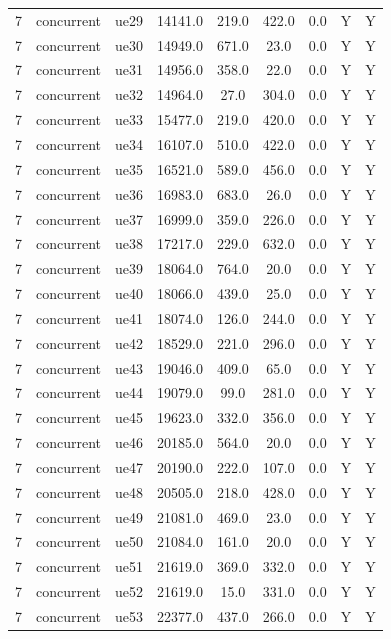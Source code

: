 \begin{table}[ht]
\begin{tabular}{|c|c|c|c|c|c|c|c|c|}
7 & concurrent & ue29 & 14141.0 & 219.0 & 422.0 & 0.0 & Y & Y \\
7 & concurrent & ue30 & 14949.0 & 671.0 & 23.0 & 0.0 & Y & Y \\
7 & concurrent & ue31 & 14956.0 & 358.0 & 22.0 & 0.0 & Y & Y \\
7 & concurrent & ue32 & 14964.0 & 27.0 & 304.0 & 0.0 & Y & Y \\
7 & concurrent & ue33 & 15477.0 & 219.0 & 420.0 & 0.0 & Y & Y \\
7 & concurrent & ue34 & 16107.0 & 510.0 & 422.0 & 0.0 & Y & Y \\
7 & concurrent & ue35 & 16521.0 & 589.0 & 456.0 & 0.0 & Y & Y \\
7 & concurrent & ue36 & 16983.0 & 683.0 & 26.0 & 0.0 & Y & Y \\
7 & concurrent & ue37 & 16999.0 & 359.0 & 226.0 & 0.0 & Y & Y \\
7 & concurrent & ue38 & 17217.0 & 229.0 & 632.0 & 0.0 & Y & Y \\
7 & concurrent & ue39 & 18064.0 & 764.0 & 20.0 & 0.0 & Y & Y \\
7 & concurrent & ue40 & 18066.0 & 439.0 & 25.0 & 0.0 & Y & Y \\
7 & concurrent & ue41 & 18074.0 & 126.0 & 244.0 & 0.0 & Y & Y \\
7 & concurrent & ue42 & 18529.0 & 221.0 & 296.0 & 0.0 & Y & Y \\
7 & concurrent & ue43 & 19046.0 & 409.0 & 65.0 & 0.0 & Y & Y \\
7 & concurrent & ue44 & 19079.0 & 99.0 & 281.0 & 0.0 & Y & Y \\
7 & concurrent & ue45 & 19623.0 & 332.0 & 356.0 & 0.0 & Y & Y \\
7 & concurrent & ue46 & 20185.0 & 564.0 & 20.0 & 0.0 & Y & Y \\
7 & concurrent & ue47 & 20190.0 & 222.0 & 107.0 & 0.0 & Y & Y \\
7 & concurrent & ue48 & 20505.0 & 218.0 & 428.0 & 0.0 & Y & Y \\
7 & concurrent & ue49 & 21081.0 & 469.0 & 23.0 & 0.0 & Y & Y \\
7 & concurrent & ue50 & 21084.0 & 161.0 & 20.0 & 0.0 & Y & Y \\
7 & concurrent & ue51 & 21619.0 & 369.0 & 332.0 & 0.0 & Y & Y \\
7 & concurrent & ue52 & 21619.0 & 15.0 & 331.0 & 0.0 & Y & Y \\
7 & concurrent & ue53 & 22377.0 & 437.0 & 266.0 & 0.0 & Y & Y \\

\end{tabular}
\end{table}
